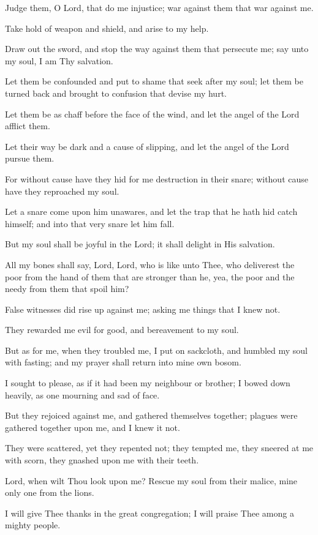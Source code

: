 Judge them, O Lord, that do me injustice; war against them that war against me.

Take hold of weapon and shield, and arise to my help.

Draw out the sword, and stop the way against them that persecute me; say unto my soul, I am Thy salvation.

Let them be confounded and put to shame that seek after my soul; let them be turned back and brought to confusion that devise my hurt.

Let them be as chaff before the face of the wind, and let the angel of the Lord afflict them.

Let their way be dark and a cause of slipping, and let the angel of the Lord pursue them.

For without cause have they hid for me destruction in their snare; without cause have they reproached my soul.

Let a snare come upon him unawares, and let the trap that he hath hid catch himself; and into that very snare let him fall.

But my soul shall be joyful in the Lord; it shall delight in His salvation.

All my bones shall say, Lord, Lord, who is like unto Thee, who deliverest the poor from the hand of them that are stronger than he, yea, the poor and the needy from them that spoil him?

False witnesses did rise up against me; asking me things that I knew not.

They rewarded me evil for good, and bereavement to my soul.

But as for me, when they troubled me, I put on sackcloth, and humbled my soul with fasting; and my prayer shall return into mine own bosom.

I sought to please, as if it had been my neighbour or brother; I bowed down heavily, as one mourning and sad of face.

But they rejoiced against me, and gathered themselves together; plagues were gathered together upon me, and I knew it not.

They were scattered, yet they repented not; they tempted me, they sneered at me with scorn, they gnashed upon me with their teeth.

Lord, when wilt Thou look upon me? Rescue my soul from their malice, mine only one from the lions.

I will give Thee thanks in the great congregation; I will praise Thee among a mighty people.

